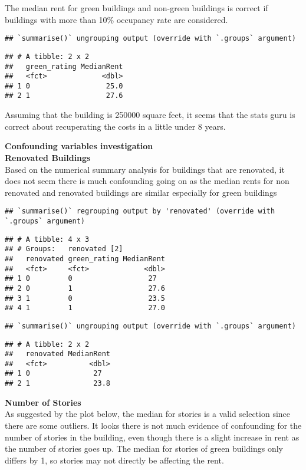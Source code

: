 \documentclass[
]{article}
\begin{document}
The median rent for green buildings and non-green buildings is correct
if buildings with more than 10\% occupancy rate are considered.

\begin{verbatim}
## `summarise()` ungrouping output (override with `.groups` argument)
\end{verbatim}

\begin{verbatim}
## # A tibble: 2 x 2
##   green_rating MedianRent
##   <fct>             <dbl>
## 1 0                  25.0
## 2 1                  27.6
\end{verbatim}

Assuming that the building is 250000 square feet, it seems that the
stats guru is correct about recuperating the costs in a little under 8
years.

\textbf{Confounding variables investigation}\\

\textbf{Renovated Buildings}\\
Based on the numerical summary analysis for buildings that are
renovated, it does not seem there is much confounding going on as the
median rents for non renovated and renovated buildings are similar
especially for green buildings

\begin{verbatim}
## `summarise()` regrouping output by 'renovated' (override with `.groups` argument)
\end{verbatim}

\begin{verbatim}
## # A tibble: 4 x 3
## # Groups:   renovated [2]
##   renovated green_rating MedianRent
##   <fct>     <fct>             <dbl>
## 1 0         0                  27  
## 2 0         1                  27.6
## 3 1         0                  23.5
## 4 1         1                  27.0
\end{verbatim}

\begin{verbatim}
## `summarise()` ungrouping output (override with `.groups` argument)
\end{verbatim}

\begin{verbatim}
## # A tibble: 2 x 2
##   renovated MedianRent
##   <fct>          <dbl>
## 1 0               27  
## 2 1               23.8
\end{verbatim}

\textbf{Number of Stories}\\
As suggested by the plot below, the median for stories is a valid
selection since there are some outliers. It looks there is not much
evidence of confounding for the number of stories in the building, even
though there is a slight increase in rent as the number of stories goes
up. The median for stories of green buildings only differs by 1, so
stories may not directly be affecting the rent.
\end{document}
